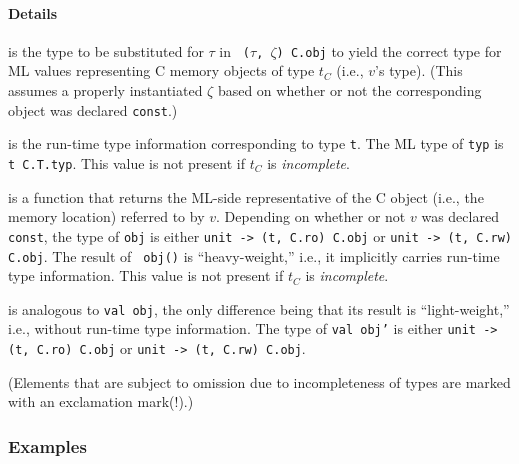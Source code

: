 \documentclass[titlepage,letterpaper]{article}
\begin{document}
\paragraph*{Details}

\begin{description}\setlength{\itemsep}{0pt}
\item[{\tt type t}] is the type to be substituted for $\tau$ in {\tt
    ($\tau$, $\zeta$) C.obj} to yield the correct type for ML values
  representing C memory objects of type $t_C$ (i.e., $v$'s type).
  (This assumes a properly instantiated $\zeta$ based on whether or
  not the corresponding object was declared {\tt const}.)
\item[!{\tt val typ}] is the run-time type information corresponding
  to type {\tt t}.  The ML type of {\tt typ} is {\tt t C.T.typ}.  This
  value is not present if $t_C$ is {\em incomplete}.
\item[!{\tt val obj}] is a function that returns the ML-side
  representative of the C object (i.e., the memory location) referred
  to by $v$.  Depending on whether or not $v$ was declared {\tt
    const}, the type of {\tt obj} is either {\tt unit -> (t, C.ro)
    C.obj} or {\tt unit -> (t, C.rw) C.obj}.  The result of {\tt
    obj()} is ``heavy-weight,'' i.e., it implicitly carries run-time
  type information.  This value is not present if $t_C$ is {\em
    incomplete}.
\item[{\tt val obj'}] is analogous to {\tt val obj}, the only
  difference being that its result is ``light-weight,'' i.e., without
  run-time type information.  The type of {\tt val obj'} is
  either {\tt unit -> (t, C.ro) C.obj} or {\tt unit -> (t, C.rw) C.obj}.
\end{description}

(Elements that are subject to omission due to incompleteness of types
are marked with an exclamation mark(!).)

\subsubsection*{Examples}
\end{document}
